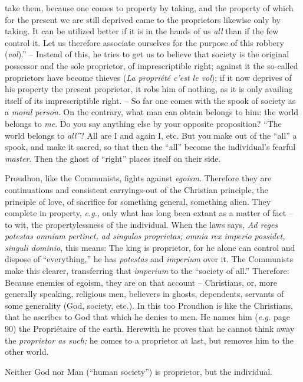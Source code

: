 take them, because one comes to property by taking, and the property of which 
for the present we are still deprived came to the proprietors likewise only by 
taking. It can be utilized better if it is in the hands of us \textit{all} 
than if the few control it. Let us therefore associate ourselves for the 
purpose of this robbery (\textit{vol}).'' -- Instead of this, he tries to get 
us to believe that society is the original possessor and the sole proprietor, 
of imprescriptible right; against it the so-called proprietors have become 
thieves (\textit{La propri\'et\'e c'est le vol}); if it now deprives of his 
property the present proprietor, it robs him of nothing, as it is only 
availing itself of its imprescriptible right. -- So far one comes with the 
spook of society as a \textit{moral person}. On the contrary, what man can 
obtain belongs to him: the world belongs to \textit{me}. Do you say anything 
else by your opposite proposition? ``The world belongs to \textit{all''}? 
All are I and again I, etc. But you make out of the ``all'' a spook, and 
make it sacred, so that then the ``all'' become the individual's fearful 
\textit{master}. Then the ghost of ``right'' places itself on their side.

Proudhon, like the Communists, fights against \textit{egoism}. Therefore they 
are continuations and consistent carryings-out of the Christian principle, the 
principle of love, of sacrifice for something general, something alien. They 
complete in property, \textit{e.g.,} only what has long been extant as a 
matter of fact -- to wit, the propertylessness of the individual. When the 
laws says, \textit{Ad reges potestas omnium pertinet, ad singulos proprietas; 
omnia rex imperio possidet, singuli dominio}, this means: The king is 
proprietor, for he alone can control and dispose of ``everything,'' he has 
\textit{potestas} and \textit{imperium} over it. The Communists make this 
clearer, transferring that \textit{imperium} to the ``society of all.'' 
Therefore: Because enemies of egoism, they are on that account -- Christians, 
or, more generally speaking, religious men, believers in ghosts, dependents, 
servants of some generality (God, society, etc.). In this too Proudhon is like 
the Christians, that he ascribes to God that which he denies to men. He names 
him (\textit{e.g.} page 90) the Propri\'etaire of the earth. Herewith he 
proves that he cannot think away the \textit{proprietor as such;} he comes to 
a proprietor at last, but removes him to the other world.

Neither God nor Man (``human society'') is proprietor, but the individual.

